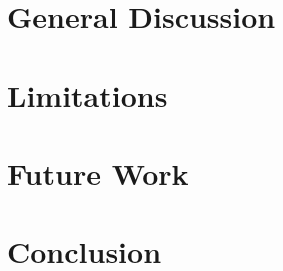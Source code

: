 \documentclass[manuscript,screen,review]{acmart}
\begin{document}
\section{General Discussion}\label{general-discussion}

\section{Limitations}\label{limitations}

\section{Future Work}\label{future-work}

\section{Conclusion}\label{conclusion}




\end{document}
